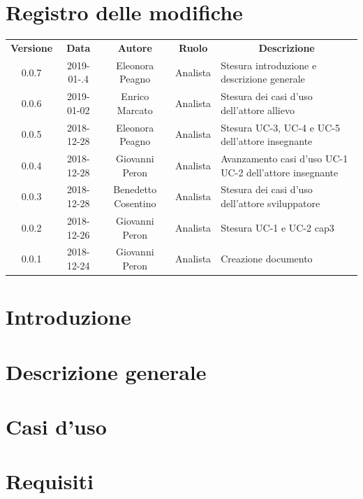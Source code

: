 \documentclass[11pt,a4paper]{article}
\begin{document}
	
	
	\newpage
	\section*{\centering Registro delle modifiche}
	\begin{tabularx}{\textwidth}{ c | c | c | c | X }
		\rowcolor{LightBlue}
		\color{white}\bfseries Versione & \color{white}\bfseries Data & \color{white}\bfseries Autore & \color{white}\bfseries Ruolo & \multicolumn{1}{c}{\color{white}\bfseries Descrizione}\\[0.25cm]
		0.0.7 & 2019-01-.4 & Eleonora Peagno & Analista & Stesura introduzione e descrizione generale\\
		0.0.6 & 2019-01-02 & Enrico Marcato & Analista & Stesura dei casi d'uso dell'attore allievo\\
		0.0.5 & 2018-12-28 & Eleonora Peagno & Analista & Stesura UC-3, UC-4 e UC-5 dell'attore insegnante\\
		0.0.4 & 2018-12-28 & Giovanni Peron & Analista & Avanzamento casi d'uso UC-1 UC-2 dell'attore insegnante\\
		0.0.3 & 2018-12-28 & Benedetto Cosentino & Analista & Stesura dei casi d'uso dell'attore sviluppatore\\
		0.0.2 & 2018-12-26 & Giovanni Peron & Analista & Stesura UC-1 e UC-2 cap3\\
		0.0.1 & 2018-12-24 & Giovanni Peron & Analista & Creazione documento\\
	\end{tabularx}
	\newpage
	\tableofcontents
	\newpage	
	\section{Introduzione}
			
		\newpage	
	\section{Descrizione generale}
		
		\newpage	

	\section{Casi d'uso}
		
		
		\newpage	
	\section{Requisiti}
		
		
\end{document}
